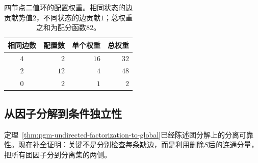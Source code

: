 \begin{table}[htbp]
  \centering
  \begin{tabular}{crrr}
    \toprule
    相同边数 & 配置数 & 单个权重 & 总权重 \\
    \midrule
    $4$ & $2$ & $16$ & $32$ \\
    $2$ & $12$ & $4$ & $48$ \\
    $0$ & $2$ & $1$ & $2$ \\
    \bottomrule
  \end{tabular}
  \caption{四节点二值环的配置权重。相同状态的边贡献势值$2$，不同状态的边贡献$1$；总权重之和为配分函数$82$。}
  \label{tab:pgm-undirected-cycle-weights}
\end{table}

\subsection{从因子分解到条件独立性}
\label{sec:pgm-undirected-factorization-to-markov}

定理~\ref{thm:pgm-undirected-factorization-to-global}已经陈述团分解上的分离可靠性。现在补全证明：关键不是分别检查每条缺边，而是利用删除$S$后的连通分量，把所有团因子分到分离集的两侧。

